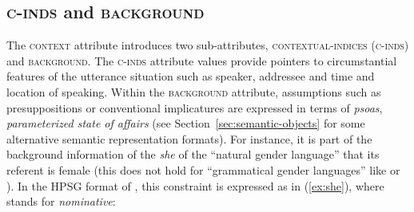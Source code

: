 \documentclass[output=paper
 	        ,biblatex
                ,babelshorthands
                ,newtxmath
                ,draftmode
                ,colorlinks, citecolor=brown
]{langscibook}
\begin{document}
\subsection{\textsc{c-inds} and \textsc{background}}
\label{sec:c-inds-background}
 
The \textsc{context} attribute introduces two sub-attributes, \textsc{contextual-indices} (\textsc{c-inds}) and \textsc{background}.
%
The \textsc{c-inds} attribute values provide pointers to circumstantial features of the utterance situation such as speaker, addressee and time and location of speaking.
%
Within the \textsc{background} attribute, assumptions such as presuppositions or conventional implicatures are expressed in terms of \emph{psoas}, \emph{parameterized state of affairs} (see Section~\ref{sec:semantic-objects} for some alternative semantic representation formats). 
%
For instance, it is part of the background information of the  \textit{she} of the \enquote{natural gender language}  that its referent is female (this does not hold for \enquote{grammatical gender languages} like  or ).
%
In the HPSG format of \citet[]{Pollard:Sag:1994}, this constraint is expressed as in (\ref{ex:she}), where  stands for \emph{nominative}:
%
\ea \label{ex:she}
\z
\end{document}
